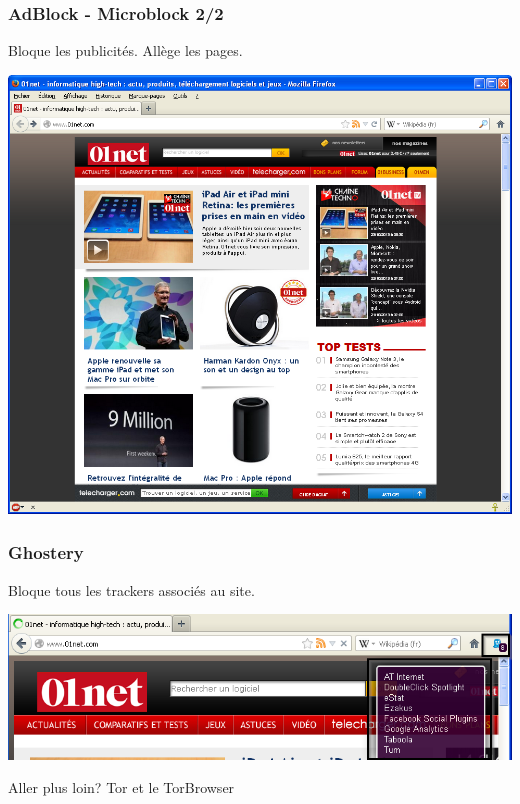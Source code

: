 \documentclass{beamer}
\begin{document}
\begin{frame}
\frametitle{AdBlock - Microblock 2/2}
Bloque les publicités. Allège les pages.

\begin{center}
\includegraphics[scale=0.4] {./images/Adblock02.png}
\end{center}
\end{frame}

\begin{frame}
\frametitle{Ghostery}

Bloque tous les trackers associés au site.
\begin{center}
\includegraphics[scale=0.4] {./images/Ghostery_tracker.png}
\end{center}
\end{frame}

\begin{frame}
\begin{center}
\Huge{Aller plus loin? Tor et le TorBrowser}
\end{center}
\end{frame}
\end{document}
